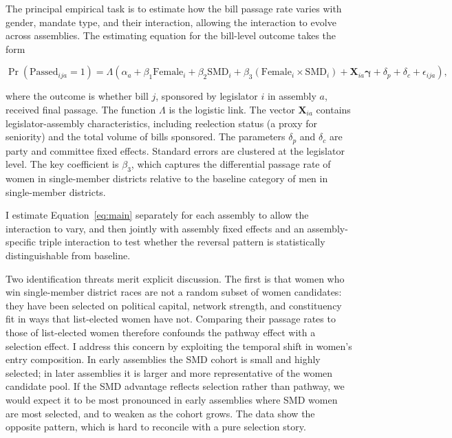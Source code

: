 \documentclass[11pt]{article}
\begin{document}
The principal empirical task is to estimate how the bill passage rate varies with gender, mandate type, and their interaction, allowing the interaction to evolve across assemblies. The estimating equation for the bill-level outcome takes the form

\begin{equation}
\Pr(\text{Passed}_{ija} = 1) = \Lambda\left(\alpha_a + \beta_1 \text{Female}_i + \beta_2 \text{SMD}_i + \beta_3 (\text{Female}_i \times \text{SMD}_i) + \mathbf{X}_{ia} \boldsymbol{\gamma} + \delta_p + \delta_c + \epsilon_{ija}\right),
\label{eq:main}
\end{equation}

where the outcome is whether bill $j$, sponsored by legislator $i$ in assembly $a$, received final passage. The function $\Lambda$ is the logistic link. The vector $\mathbf{X}_{ia}$ contains legislator-assembly characteristics, including reelection status (a proxy for seniority) and the total volume of bills sponsored. The parameters $\delta_p$ and $\delta_c$ are party and committee fixed effects. Standard errors are clustered at the legislator level. The key coefficient is $\beta_3$, which captures the differential passage rate of women in single-member districts relative to the baseline category of men in single-member districts.

I estimate Equation~\ref{eq:main} separately for each assembly to allow the interaction to vary, and then jointly with assembly fixed effects and an assembly-specific triple interaction to test whether the reversal pattern is statistically distinguishable from baseline.

Two identification threats merit explicit discussion. The first is that women who win single-member district races are not a random subset of women candidates: they have been selected on political capital, network strength, and constituency fit in ways that list-elected women have not. Comparing their passage rates to those of list-elected women therefore confounds the pathway effect with a selection effect. I address this concern by exploiting the temporal shift in women's entry composition. In early assemblies the SMD cohort is small and highly selected; in later assemblies it is larger and more representative of the women candidate pool. If the SMD advantage reflects selection rather than pathway, we would expect it to be most pronounced in early assemblies where SMD women are most selected, and to weaken as the cohort grows. The data show the opposite pattern, which is hard to reconcile with a pure selection story.
\end{document}

